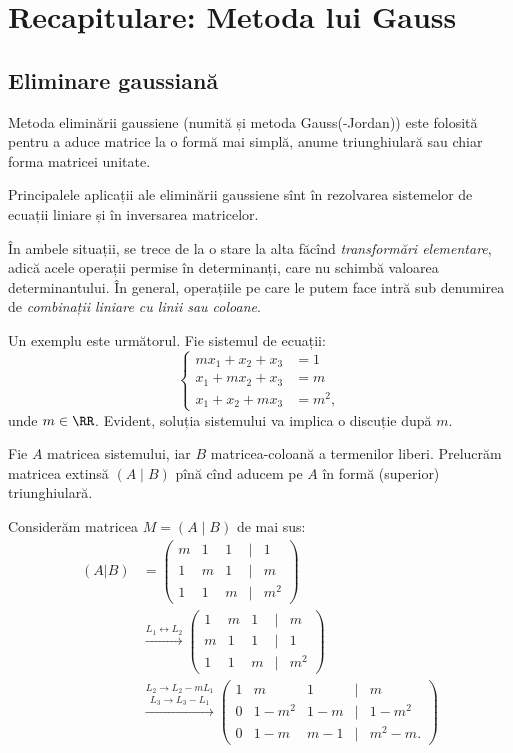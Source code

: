 
\chapter{Recapitulare: Metoda lui Gauss}

\section{Eliminare gaussiană}

Metoda eliminării gaussiene (numită și metoda Gauss(-Jordan)) este folosită
pentru a aduce matrice la o formă mai simplă, anume triunghiulară sau chiar
forma matricei unitate.

Principalele aplicații ale eliminării gaussiene sînt în rezolvarea sistemelor
de ecuații liniare și în inversarea matricelor.

În ambele situații, se trece de la o stare la alta făcînd \emph{transformări %
  elementare}, adică acele operații permise în determinanți, care nu schimbă
valoarea determinantului. În general, operațiile pe care le putem face intră
sub denumirea de \emph{combinații liniare cu linii sau coloane}.

Un exemplu este următorul. Fie sistemul de ecuații:
\[
  \begin{cases}
    mx_1 + x_2 + x_3 &= 1 \\
    x_1 + mx_2 + x_3 &= m \\
    x_1 + x_2 + mx_3 &= m^2,
  \end{cases}
\]
unde $ m \in \RR $. Evident, soluția sistemului va implica o discuție după $ m $.

Fie $ A $ matricea sistemului, iar $ B $ matricea-coloană a termenilor liberi.
Prelucrăm matricea extinsă $ (A \mid B) $ pînă cînd aducem pe $ A $ în formă
(superior) triunghiulară.

Considerăm matricea $M = (A \mid B) $ de mai sus:
\begin{align*}
  (A | B) &= \begin{pmatrix}
    m & 1 & 1 & \mid & 1 \\
    1 & m & 1 & \mid & m \\
    1 & 1 & m & \mid & m^2
  \end{pmatrix} \\
          &\xrightarrow{L_1 \leftrightarrow L_2}
            \begin{pmatrix}
              1 & m & 1 & \mid & m \\
              m & 1 & 1 & \mid & 1 \\
              1 & 1 & m & \mid & m^2
            \end{pmatrix} \\
          &\stackrel{L_2 \to L_2 - mL_1}{\xrightarrow{L_3 \to L_3 - L_1}}
            \begin{pmatrix}
              1 & m & 1 & \mid & m \\
              0 & 1 - m^2 & 1 - m & \mid & 1 - m^2 \\
              0 & 1 - m & m - 1 & \mid & m^2 - m.
            \end{pmatrix}
\end{align*}

